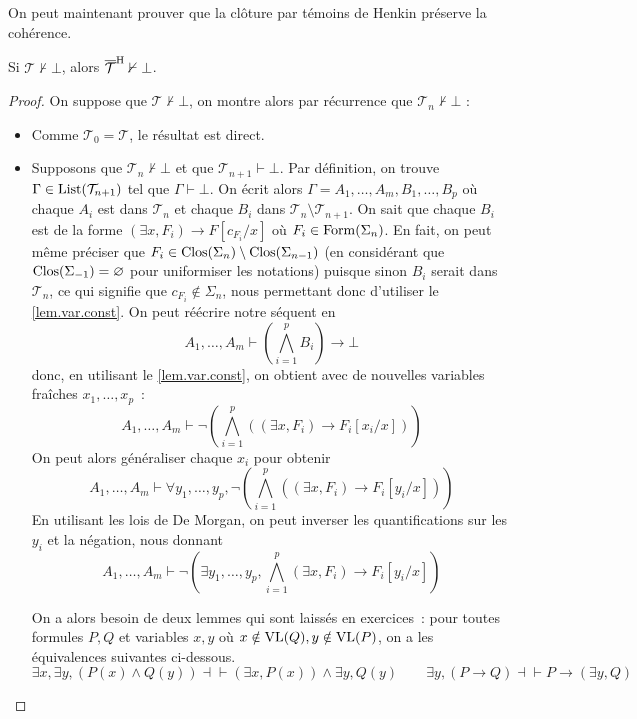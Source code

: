 On peut maintenant prouver que la clôture par témoins de Henkin préserve la
cohérence.

\begin{property}
  Si $\mathcal T\nvdash \bot$, alors $\overline{\mathcal T}^{\mathrm H}\nvdash\bot$.
\end{property}

\begin{proof}
  On suppose que $\mathcal T\nvdash\bot$, on montre alors par récurrence que
  $\mathcal T_n\not\vdash\bot$ :
  \begin{itemize}
  \item Comme $\mathcal T_0 =\mathcal T$, le résultat est direct.
  \item Supposons que $\mathcal T_n\not\vdash\bot$ et que
    $\mathcal T_{n+1}\vdash\bot$. Par définition, on trouve
    $\Gamma\in\operatorname{List}(\mathcal T_{n+1})$ tel que $\Gamma\vdash\bot$. On écrit
    alors $\Gamma = A_1,\ldots,A_m,B_1,\ldots,B_p$ où chaque $A_i$ est dans
    $\mathcal T_n$ et chaque $B_i$ dans
    $\mathcal T_n\setminus\mathcal T_{n+1}$. On sait que chaque $B_i$ est de
    la forme $(\exists x,F_i)\to F[c_{F_i}/x]$ où $F_i\in\operatorname{Form}(\Sigma_n)$.
    En fait, on peut même préciser que
    $F_i \in\operatorname{Clos}(\Sigma_n)\setminus\operatorname{Clos}(\Sigma_{n-1})$ (en considérant
    que $\operatorname{Clos}(\Sigma_{-1}) = \varnothing$ pour uniformiser les notations)
    puisque sinon $B_i$ serait dans $\mathcal T_n$, ce qui signifie que
    $c_{F_i}\notin\Sigma_n$, nous permettant donc d'utiliser le
    \cref{lem.var.const}. On peut réécrire notre séquent en
    \[A_1,\ldots,A_m\vdash \left(\bigwedge_{i=1}^p B_i\right) \to \bot\]
    donc, en utilisant le \cref{lem.var.const}, on obtient avec de nouvelles
    variables fraîches $x_1,\ldots,x_p$~:
    \[A_1,\ldots,A_m\vdash
    \lnot \left(\bigwedge_{i = 1}^p ((\exists x, F_i)\to F_i[x_i/x])\right)\]
    On peut alors généraliser chaque $x_i$ pour obtenir
    \[A_1,\ldots,A_m\vdash \forall y_1,\ldots,y_p, \lnot \left(
    \bigwedge_{i = 1}^p ((\exists x, F_i) \to F_i[y_i/x])\right)\]
    En utilisant les lois de De Morgan, on peut inverser les quantifications sur
    les $y_i$ et la négation, nous donnant
    \begin{equation}\label{eq.henk}
      A_1,\ldots,A_m\vdash \lnot \left(\exists y_1,\ldots,y_p,
      \bigwedge_{i = 1}^p (\exists x, F_i) \to F_i[y_i/x]\right)
    \end{equation}

    On a alors besoin de deux lemmes qui sont laissés en exercices~: pour toutes
    formules $P,Q$ et variables $x,y$ où $x\notin\operatorname{VL}(Q), y \notin\operatorname{VL}(P)$, on
    a les équivalences suivantes ci-dessous.
    \[\exists x, \exists y, (P(x)\land Q(y)) \dashv\vdash (\exists x,P(x))\land
    \exists y,Q(y)
    \qquad \exists y, (P \to Q) \dashv\vdash P \to (\exists y, Q)\]


\end{itemize}
\end{proof}
